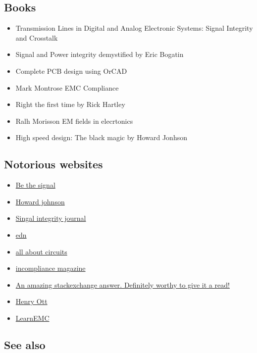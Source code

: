 \documentclass[12pt]{article}
\begin{document}
\subsection{Books}
\begin{itemize}
	\item Transmission Lines in Digital and Analog Electronic Systems: Signal Integrity and Crosstalk
	\item Signal and Power integrity demystified by Eric Bogatin
	\item Complete PCB design using OrCAD
	\item Mark Montrose EMC Compliance
	\item Right the first time by Rick Hartley
	\item Ralh Morisson EM fields in elecrtonics
	\item High speed design: The black magic by Howard Jonhson
\end{itemize}

\subsection{Notorious websites}
\begin{itemize}
	\item \href{https://bethesignal.com/bogatin/}{Be the signal}
	\item \href{http://www.sigcon.com/}{Howard johnson}
	\item \href{https://www.signalintegrityjournal.com/}{Singal integrity journal}
	\item \href{https://www.edn.com/}{edn}
	\item \href{https://www.allaboutcircuits.com/}{all about circuits}
	\item \href{https://incompliancemag.com/topics/resources/}{incompliance magazine}
	\item \href{https://electronics.stackexchange.com/questions/15135/decoupling-caps-pcb-layout/15143#15143}{An amazing stackexchange answer. Definitely worthy to give it a read!}
	\item \href{http://www.hottconsultants.com/}{Henry Ott}
	\item \href{https://learnemc.com/}{LearnEMC}
\end{itemize}

\subsection{See also}
\end{document}

